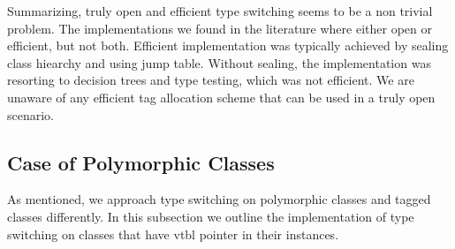 \documentclass[preprint]{sigplanconf}
\makeatletter
\DeclareRobustCommand{\code}[1]{{\lstinline[breaklines=false,escapechar=@]{#1}}}
\makeatother
\begin{document}
Summarizing, truly open and efficient type switching seems to be a non trivial 
problem. The implementations we found in the literature where either open or 
efficient, but not both. Efficient implementation was typically achieved by 
sealing class hiearchy and using jump table. Without sealing, the implementation 
was resorting to decision trees and type testing, which was not efficient.
We are unaware of any efficient tag allocation scheme that can be used in a 
truly open scenario.


%

%

\subsection{Case of Polymorphic Classes}
\label{sec:copc}

As mentioned, we approach type switching on polymorphic classes and tagged 
classes differently. In this subsection we outline the implementation of type 
switching on classes that have vtbl pointer in their instances.

\end{document}
